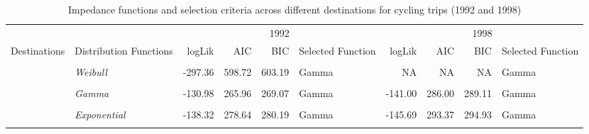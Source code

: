 \documentclass[12pt,twoside]{reedthesis}
\begin{document}
\begin{landscape}\begin{table}[!h]

\caption{\label{tab:table-imc1}\label{tab:table_18}Impedance functions and selection criteria across different destinations for cycling trips (1992 and 1998)}
\centering
\fontsize{7}{9}\selectfont
\begin{tabular}[t]{>{}l|>{}lrrrlrrrl}
\toprule
\multicolumn{2}{c}{ } & \multicolumn{4}{c}{1992} & \multicolumn{4}{c}{1998} \\
\cmidrule(l{3pt}r{3pt}){3-6} \cmidrule(l{3pt}r{3pt}){7-10}
Destinations & Distribution Functions & logLik & AIC & BIC & Selected Function & logLik & AIC & BIC & Selected Function\\
\midrule
\textbf{\cellcolor{gray!6}{}} & \em{\cellcolor{gray!6}{Gamma}} & \cellcolor{gray!6}{-296.80} & \cellcolor{gray!6}{597.61} & \cellcolor{gray!6}{602.07} & \cellcolor{gray!6}{Gamma} & \cellcolor{gray!6}{-250.55} & \cellcolor{gray!6}{505.09} & \cellcolor{gray!6}{509.38} & \cellcolor{gray!6}{Gamma}\\
\cmidrule{2-10}
\textbf{} & \em{Weibull} & -297.36 & 598.72 & 603.19 & Gamma & NA & NA & NA & Gamma\\
\cmidrule{2-10}
\textbf{\cellcolor{gray!6}{\multirow[t]{-3}{*}{\raggedright\arraybackslash Home}}} & \em{\cellcolor{gray!6}{Exponential}} & \cellcolor{gray!6}{-299.38} & \cellcolor{gray!6}{600.77} & \cellcolor{gray!6}{603.00} & \cellcolor{gray!6}{Gamma} & \cellcolor{gray!6}{-253.36} & \cellcolor{gray!6}{508.72} & \cellcolor{gray!6}{510.86} & \cellcolor{gray!6}{Gamma}\\
\cmidrule{1-10}
\textbf{} & \em{Gamma} & -130.98 & 265.96 & 269.07 & Gamma & -141.00 & 286.00 & 289.11 & Gamma\\
\cmidrule{2-10}
\textbf{\cellcolor{gray!6}{}} & \em{\cellcolor{gray!6}{Weibull}} & \cellcolor{gray!6}{-131.06} & \cellcolor{gray!6}{266.11} & \cellcolor{gray!6}{269.22} & \cellcolor{gray!6}{Gamma} & \cellcolor{gray!6}{-141.71} & \cellcolor{gray!6}{287.42} & \cellcolor{gray!6}{290.53} & \cellcolor{gray!6}{Gamma}\\
\cmidrule{2-10}
\textbf{} & \em{Exponential} & -138.32 & 278.64 & 280.19 & Gamma & -145.69 & 293.37 & 294.93 & Gamma\\
\cmidrule{2-10}
\textbf{\cellcolor{gray!6}{}} & \em{\cellcolor{gray!6}{Normal}} & \cellcolor{gray!6}{-134.55} & \cellcolor{gray!6}{273.10} & \cellcolor{gray!6}{276.21} & \cellcolor{gray!6}{Gamma} & \cellcolor{gray!6}{-148.73} & \cellcolor{gray!6}{301.45} & \cellcolor{gray!6}{304.56} & \cellcolor{gray!6}{Gamma}\\

\end{tabular}
\end{table}
\end{landscape}
\end{document}
